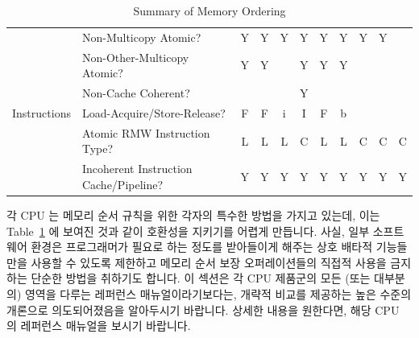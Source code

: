 \begin{table}[tbh]
\begin{tabular}{llccccccccc}
	& Non-Multicopy Atomic?
		 & Y   & Y   & Y   & Y     & Y  & Y & Y   & Y & ~ \\
\cellcolor{white}
	& Non-Other-Multicopy Atomic?
		 & Y   & Y   & ~   & Y     & Y  & Y & ~   & ~ & ~ \\
	& Non-Cache Coherent?
		 & ~   & ~   & ~   & Y     & ~  & ~ & ~   & ~ & ~ \\
	\cmidrule(r){1-2} \cmidrule{3-11}
\cellcolor{white}
	Instructions
	& Load-Acquire/Store-Release?
		 & F   & F   & i   & I     & F  & b & ~   & ~ & ~ \\
	& Atomic RMW Instruction Type?
		 & L   & L   & L   & C     & L  & L & C   & C & C \\
\cellcolor{white}
	& Incoherent Instruction Cache/Pipeline?
		 & Y   & Y   & Y   & Y     & Y  & Y & Y   & Y & Y \\
	\bottomrule
\end{tabular}

\vspace{5pt}\hfill
{}\OneColumnHSpace{-0.4in}
\caption{Summary of Memory Ordering}
\label{tab:memorder:Summary of Memory Ordering}
\end{table}

각 CPU 는 메모리 순서 규칙을 위한 각자의 특수한 방법을 가지고 있는데, 이는
Table~\ref{tab:memorder:Summary of Memory Ordering} 에 보여진 것과 같이
호환성을 지키기를 어렵게 만듭니다.
사실, 일부 소프트웨어 환경은 프로그래머가 필요로 하는 정도를 받아들이게 해주는
상호 배타적 기능들만을 사용할 수 있도록 제한하고 메모리 순서 보장
오퍼레이션들의 직접적 사용을 금지하는 단순한 방법을 취하기도 합니다.
이 섹션은 각 CPU 제품군의 모든 (또는 대부분의) 영역을 다루는 레퍼런스
매뉴얼이라기보다는, 개략적 비교를 제공하는 높은 수준의 개론으로 의도되어졌음을
알아두시기 바랍니다.
상세한 내용을 원한다면, 해당 CPU 의 레퍼런스 매뉴얼을 보시기 바랍니다.
\iffalse

